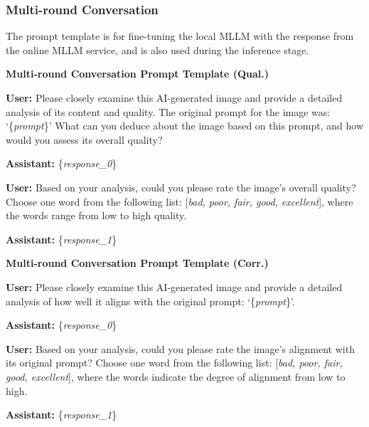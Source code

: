 \subsubsection{Multi-round Conversation}
The prompt template is for fine-tuning the local MLLM with the response from the online MLLM service, and is also used during the inference stage.
\begin{mdframed}[linecolor=black,linewidth=0.5pt,roundcorner=10pt]
\textbf{Multi-round Conversation Prompt Template (Qual.)}

\textbf{User:} Please closely examine this AI-generated image and provide a detailed analysis of its content and quality. The original prompt for the image was: `\{\textit{prompt}\}' What can you deduce about the image based on this prompt, and how would you assess its overall quality?

\textbf{Assistant:} \{\textit{response\_0}\}

\textbf{User:} Based on your analysis, could you please rate the image's overall quality? Choose one word from the following list: [\textit{bad, poor, fair, good, excellent}], where the words range from low to high quality.

\textbf{Assistant:} \{\textit{response\_1}\}
\end{mdframed}

\begin{mdframed}[linecolor=black,linewidth=0.5pt,roundcorner=10pt]
    \textbf{Multi-round Conversation Prompt Template (Corr.)}
    
    \textbf{User:} Please closely examine this AI-generated image and provide a detailed analysis of how well it aligns with the original prompt: `\{\textit{prompt}\}'.
    
    \textbf{Assistant:} \{\textit{response\_0}\}
    
    \textbf{User:} Based on your analysis, could you please rate the image's alignment with its original prompt? Choose one word from the following list: [\textit{bad, poor, fair, good, excellent}], where the words indicate the degree of alignment from low to high.
    
    \textbf{Assistant:} \{\textit{response\_1}\}
    \end{mdframed}

